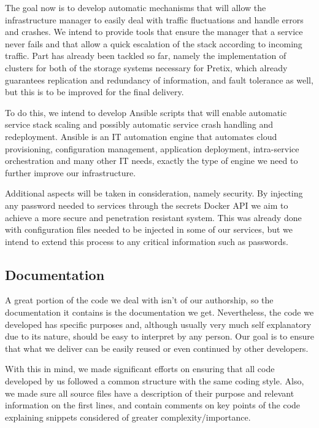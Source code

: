 \documentclass[12pt]{article}
\begin{document}
The goal now is to develop automatic mechanisms that will allow the infrastructure manager to easily deal with traffic fluctuations and handle errors and crashes.
We intend to provide tools that ensure the manager that a service never fails and that allow a quick escalation of the stack according to incoming traffic.
Part has already been tackled so far, namely the implementation of clusters for both of the storage systems necessary for Pretix, which already guarantees 
replication and redundancy of information, and fault tolerance as well, but this is to be improved for the final delivery.

To do this, we intend to develop Ansible scripts that will enable automatic service stack scaling and possibly automatic service crash handling and redeployment.
Ansible \cite{ansible} is an IT automation engine that automates cloud provisioning, configuration management, application deployment, intra-service orchestration 
and many other IT needs, exactly the type of engine we need to further improve our infrastructure.

Additional aspects will be taken in consideration, namely security. 
By injecting any password needed to services through the secrets Docker API we aim to achieve a more secure and penetration resistant system. 
This was already done with configuration files needed to be injected in some of our services, but we intend to extend this process to any critical information 
such as passwords. 

\subsection{Documentation} \label{remarks.documentation} %


A great portion of the code we deal with isn't of our authorship, so the documentation it contains is the documentation we get.
Nevertheless, the code we developed has specific purposes and, although usually very much self explanatory due to its nature, should be easy to interpret by any person.
Our goal is to ensure that what we deliver can be easily reused or even continued by other developers.

With this in mind, we made significant efforts on ensuring that all code developed by us followed a common structure with the same coding style.
Also, we made sure all source files have a description of their purpose and relevant information on the first lines, and contain comments on key points of the 
code explaining snippets considered of greater complexity/importance.
\end{document}
